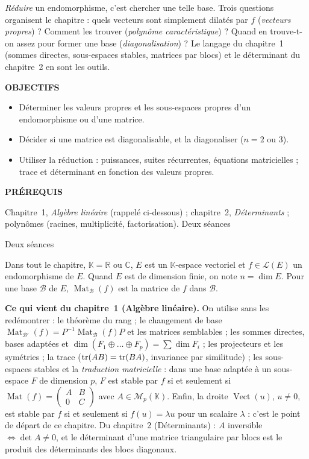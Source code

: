 \documentclass[a4paper,11pt]{article}
\numberwithin{equation}{section}
\numberwithin{figure}{section}
\numberwithin{table}{section}
\theoremstyle{enonce}
\theoremstyle{exemple}
\theoremstyle{remarque}
\newcommand{\ouverture}[3]{%
  \begin{tcolorbox}[enhanced,colback=Fond,colframe=Fond,arc=0pt,boxrule=0pt,left=12pt,right=12pt,top=10pt,bottom=10pt,
     before skip=1.2em,after skip=1.6em]
  \begin{minipage}[t]{0.56\linewidth}
  {\sffamily\bfseries\small\color{Bleu}OBJECTIFS}\par\vspace{0.3em}\small #1
  \end{minipage}\hfill
  \begin{minipage}[t]{0.38\linewidth}
  {\sffamily\bfseries\small\color{Bleu}PRÉREQUIS}\par\vspace{0.3em}\small #2
  \ifx\relax#3\relax\else\par\vspace{0.6em}{\sffamily\bfseries\small\color{Bleu}DURÉE}\par\vspace{0.2em}\small #3\fi
  \end{minipage}
  \end{tcolorbox}}
\newcommand{\K}{\mathbb{K}}
\newcommand{\R}{\mathbb{R}}
\newcommand{\C}{\mathbb{C}}
\newcommand{\LE}{\mathcal{L}(E)}
\newcommand{\vect}{\operatorname{Vect}}
\newcommand{\Mat}{\operatorname{Mat}}
\begin{document}
\emph{Réduire} un endomorphisme, c'est chercher une telle base. Trois questions organisent le chapitre : quels vecteurs sont
simplement dilatés par $f$ (\emph{vecteurs propres}) ? Comment les trouver (\emph{polynôme caractéristique}) ? Quand en
trouve-t-on assez pour former une base (\emph{diagonalisation}) ? Le langage du chapitre~1 (sommes directes, sous-espaces
stables, matrices par blocs) et le déterminant du chapitre~2 en sont les outils.

\ouverture{%
\begin{itemize}[leftmargin=1.1em,itemsep=1pt]
\item Déterminer les valeurs propres et les sous-espaces propres d'un endomorphisme ou d'une matrice.
\item Décider si une matrice est diagonalisable, et la diagonaliser ($n=2$ ou $3$).
\item Utiliser la réduction : puissances, suites récurrentes, équations matricielles ; trace et déterminant en fonction des valeurs propres.
\end{itemize}}{%
Chapitre~1, \emph{Algèbre linéaire} (rappelé ci-dessous) ; chapitre~2, \emph{Déterminants} ; polynômes (racines, multiplicité,
factorisation).}{Deux séances}

Dans tout le chapitre, $\K=\R$ ou $\C$, $E$ est un $\K$-espace vectoriel et $f\in\LE$ un endomorphisme de $E$. Quand $E$ est de
dimension finie, on note $n=\dim E$. Pour une base $\mathcal B$ de $E$, $\Mat_{\mathcal B}(f)$ est la matrice de $f$ dans $\mathcal B$.

\begin{commencer}
\textbf{Ce qui vient du chapitre~1 (Algèbre linéaire).} On utilise sans les redémontrer : le théorème du rang ; le changement de
base $\Mat_{\mathcal B'}(f)=P^{-1}\Mat_{\mathcal B}(f)P$ et les matrices semblables ; les sommes directes, bases adaptées et
$\dim(F_1\oplus\dots\oplus F_p)=\sum\dim F_i$ ; les projecteurs et les symétries ; la trace ($\operatorname{tr}(AB)=\operatorname{tr}(BA)$, invariance par
similitude) ; les sous-espaces stables et la \emph{traduction matricielle} : dans une base adaptée à un sous-espace $F$ de
dimension $p$, $F$ est stable par $f$ si et seulement si $\Mat(f)=\begin{pmatrix}A&B\\0&C\end{pmatrix}$ avec $A\in\mathcal M_p(\K)$.
Enfin, la droite $\vect(u)$, $u\neq0$, est stable par $f$ si et seulement si $f(u)=\lambda u$ pour un scalaire $\lambda$ :
c'est le point de départ de ce chapitre. Du chapitre~2 (Déterminants) : $A$ inversible $\iff\det A\neq0$, et le déterminant
d'une matrice triangulaire par blocs est le produit des déterminants des blocs diagonaux.
\end{commencer}
\end{document}
